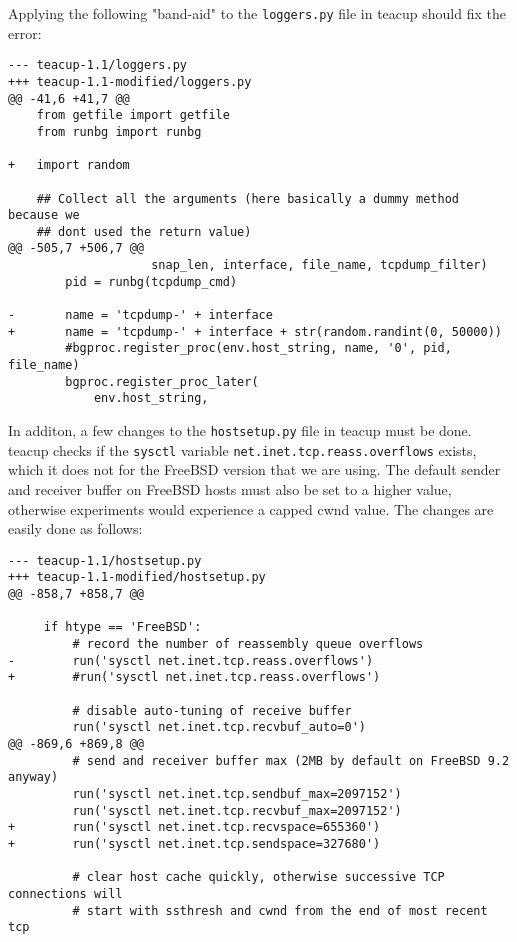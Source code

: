 Applying the following "band-aid" to the \lstinline{loggers.py} file in \gls{teacup} should fix the error:

\begin{verbatim}
--- teacup-1.1/loggers.py
+++ teacup-1.1-modified/loggers.py
@@ -41,6 +41,7 @@
    from getfile import getfile
    from runbg import runbg
    
+   import random
    
    ## Collect all the arguments (here basically a dummy method because we
    ## dont used the return value)
@@ -505,7 +506,7 @@
                    snap_len, interface, file_name, tcpdump_filter)
        pid = runbg(tcpdump_cmd)
    
-       name = 'tcpdump-' + interface
+       name = 'tcpdump-' + interface + str(random.randint(0, 50000))
        #bgproc.register_proc(env.host_string, name, '0', pid, file_name)
        bgproc.register_proc_later(
            env.host_string,
\end{verbatim}

In additon, a few changes to the \lstinline{hostsetup.py} file in \gls{teacup} must be done. \gls{teacup} checks if the \lstinline{sysctl} variable \lstinline{net.inet.tcp.reass.overflows} exists, which it does not for the FreeBSD version that we are using. The default sender and receiver buffer on FreeBSD hosts must also be set to a higher value, otherwise experiments would experience a capped \gls{cwnd} value. The changes are easily done as follows:

\begin{verbatim}
--- teacup-1.1/hostsetup.py
+++ teacup-1.1-modified/hostsetup.py
@@ -858,7 +858,7 @@
 
     if htype == 'FreeBSD':
         # record the number of reassembly queue overflows
-        run('sysctl net.inet.tcp.reass.overflows')
+        #run('sysctl net.inet.tcp.reass.overflows')
 
         # disable auto-tuning of receive buffer
         run('sysctl net.inet.tcp.recvbuf_auto=0')
@@ -869,6 +869,8 @@
         # send and receiver buffer max (2MB by default on FreeBSD 9.2 anyway)
         run('sysctl net.inet.tcp.sendbuf_max=2097152')
         run('sysctl net.inet.tcp.recvbuf_max=2097152')
+        run('sysctl net.inet.tcp.recvspace=655360')
+        run('sysctl net.inet.tcp.sendspace=327680')
 
         # clear host cache quickly, otherwise successive TCP connections will
         # start with ssthresh and cwnd from the end of most recent tcp
\end{verbatim}

